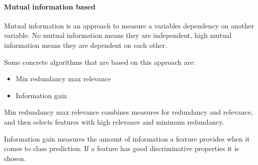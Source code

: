 \paragraph{Mutual information based}
\label{par:methods.flat.filter.mutual_information}

  
Mutual information is an approach to measure a variables dependency on
another variable. No mutual information means they are independent, high mutual
information means they are dependent on each other.

Some concrete algorithms that are based on this approach are:
\begin{itemize}
  \item Min redundancy max relevance
  \item Information gain
\end{itemize}

Min redundancy max relevance combines measures for redundancy and relevance, and
then selects features with high relevance and minimum redundancy.

Information gain measures the amount of information a feature provides when it
comes to class prediction. If a feature has good discriminative properties it is
chosen.

